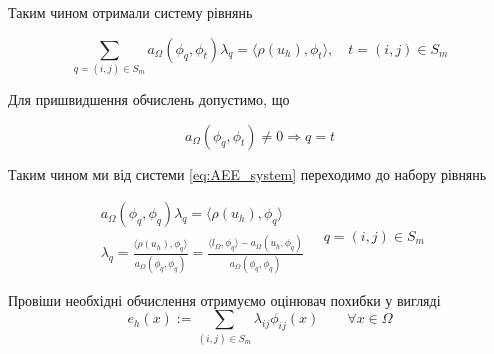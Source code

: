 Таким чином отримали систему рівнянь

\begin{equation}\label{eq:AEE_system}
	\sum \limits_{q = (i,j) \in S_m} a_\Omega(\phi_q, \phi_t) \lambda_q = \langle \rho(u_h), \phi_t \rangle, \quad t = (i,j) \in S_m
\end{equation}

Для пришвидшення обчислень допустимо, що

\begin{equation}
	a_\Omega(\phi_q, \phi_t) \neq 0 \Rightarrow q = t
\end{equation}

Таким чином ми від системи \eqref{eq:AEE_system} переходимо до набору рівнянь

\begin{equation}
	\begin{split}
		a_\Omega(\phi_q, \phi_q) \lambda_q = \langle \rho(u_h), \phi_q \rangle\\
		\lambda_q = \frac{\langle \rho(u_h), \phi_q \rangle}{a_\Omega(\phi_q, \phi_q)}
			= \frac{\langle l_\Omega, \phi_q\rangle - a_\Omega(u_h, \phi_q)}{a_\Omega(\phi_q, \phi_q)}
	\end{split}
	\quad q = (i,j) \in S_m
\end{equation}

Провіши необхідні обчислення отримуємо оцінювач похибки у вигляді
\begin{equation}\label{eq:AEE_final}
	e_h(x) := \sum \limits_{(i,j) \in S_m} \lambda_{ij} \phi_{ij}(x) \qquad \forall x \in \Omega
\end{equation}
